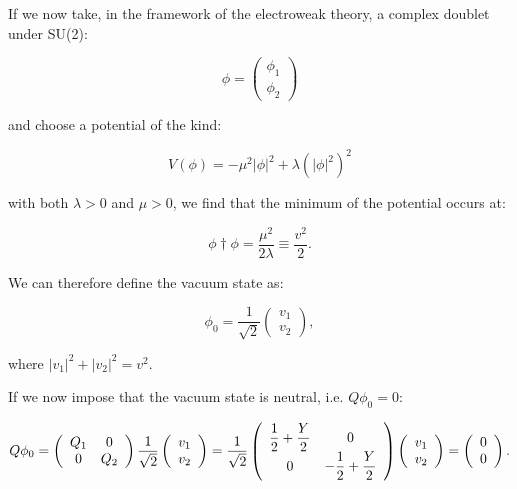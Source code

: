If we now take, in the framework of the electroweak theory, a complex doublet under SU(2):

\begin{equation}
\phi = \left(\begin{array}{c}\phi_1 \\\phi_2\end{array}\right)
\end{equation}

and choose a potential of the kind:

\begin{equation}
V(\phi) = - \mu^2 |\phi|^2 + \lambda (|\phi|^2)^2
\end{equation}

with both $\lambda > 0$ and $\mu > 0$, we find that the minimum of the potential occurs at: 

\begin{equation}
\phi\dag\phi = \dfrac{\mu^2}{2\lambda} \equiv \dfrac{v^2}{2}.
\end{equation}

We can therefore define the vacuum state as:

\begin{equation}
\phi_0 = \dfrac{1}{\sqrt{2}} \left(\begin{array}{c}v_1 \\v_2\end{array}\right),
\end{equation}

where $|v_1|^2 + |v_2|^2 = v^2$.

If we now impose that the vacuum state is neutral, i.e. $Q\phi_0 = 0$:

\begin{equation}
Q\phi_0 = \left(\begin{array}{cc}Q_1 & 0 \\0 & Q_2\end{array}\right)   \dfrac{1}{\sqrt{2}} \left(\begin{array}{c}v_1 \\v_2\end{array}\right) = \dfrac{1}{\sqrt{2}} \left(\begin{array}{cc}\dfrac{1}{2} + \dfrac{Y}{2} & 0 \\0 & -\dfrac{1}{2} + \dfrac{Y}{2}\end{array}\right) \left(\begin{array}{c}v_1 \\v_2\end{array}\right) = \left(\begin{array}{c}0 \\0\end{array}\right).
\end{equation}

